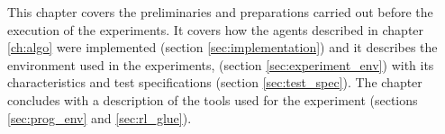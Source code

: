 This chapter covers the preliminaries and preparations carried out before the execution of the experiments. It covers how the agents described in chapter \ref{ch:algo} were implemented (section \ref{sec:implementation}) and it describes the environment used in the experiments, (section \ref{sec:experiment_env}) with its characteristics and test specifications (section \ref{sec:test_spec}). The chapter concludes with a description of the tools used for the experiment (sections \ref{sec:prog_env} and \ref{sec:rl_glue}).